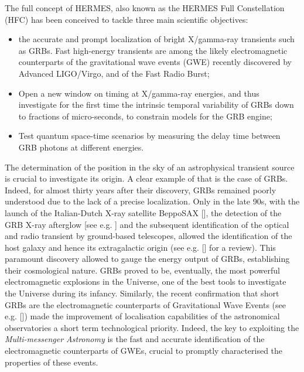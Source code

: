 \documentclass[]{spie}  %
\begin{document}
The full concept of HERMES, also known as the HERMES Full Constellation (HFC) has been conceived to tackle three main scientific objectives: 
\begin{itemize}
\item the accurate and prompt localization of bright X/gamma-ray transients such as GRBs. Fast high-energy transients are among the likely electromagnetic counterparts of the gravitational wave events (GWE) recently discovered by Advanced LIGO/Virgo, and of the Fast Radio Burst; 
\item Open a new window on timing at X/gamma-ray energies, and thus investigate for the first time the intrinsic temporal variability of GRBs down to fractions of micro-seconds, to constrain models for the GRB engine;
\item Test quantum space-time scenarios by measuring the delay time between GRB photons at different energies.
\end{itemize}

The determination of the position in the sky of an astrophysical transient source is crucial to investigate its origin. A clear example of that is the case of GRBs. Indeed, for almost thirty years after their discovery, GRBs remained poorly understood due to the lack of a precise localization. Only in the late 90s, with the launch of the Italian-Dutch X-ray satellite BeppoSAX [], the detection of the GRB X-ray afterglow [see e.g. ] and the subsequent identification of the optical and radio transient by ground-based telescopes, allowed the identification of the host galaxy and hence its extragalactic origin (see e.g. [] for a review). This paramount discovery allowed to gauge the energy output of GRBs, establishing their cosmological nature. GRBs proved to be, eventually, the most powerful electromagnetic explosions in the Universe, one of the best tools to investigate the Universe during its infancy. Similarly, the recent confirmation that short GRBs are the electromagnetic counterparts of Gravitational Wave Events (see e.g. []) made the improvement of localisation capabilities of the astronomical observatories a short term technological priority. Indeed, the key to exploiting the \emph{Multi-messenger Astronomy} is the fast and accurate identification of the electromagnetic counterparts of GWEs, crucial to promptly characterised the properties of these events. 
\end{document}
